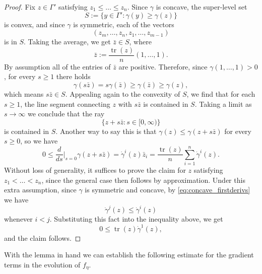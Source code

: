 \documentclass[12pt]{amsart}
\DeclareMathOperator{\tr}{tr}
\begin{document}
\begin{proof}
\label{lem:+_first_deriv}
Fix $z \in \Gamma'$ satisfying $z_1 \leq \dots \leq z_n$. Since $\gamma$ is concave, the super-level set 
\[S:= \{y \in \Gamma': \gamma(y) \geq \gamma(z)\}\]
is convex, and since $\gamma$ is symmetric, each of the vectors
\[(z_m , \dots, z_n, z_1, \dots, z_{m-1})\]
is in $S$. Taking the average, we get $\bar z \in S$, where 
\[\bar z := \frac{\tr(z)}{n} (1, \dots, 1).\]
By assumption all of the entries of $\bar z$ are positive. Therefore, since $\gamma(1,\dots,1) > 0$, for every $s \geq 1$ there holds 
\[\gamma(s\bar z) = s \gamma( \bar z) \geq \gamma(\bar z) \geq \gamma(z),\]
which means $s \bar z \in S$. Appealing again to the convexity of $S$, we find that for each $s \geq 1$, the line segment connecting $z$ with $s \bar z$ is contained in $S$. Taking a limit as $s \to \infty$ we conclude that the ray
\[\{z + s \bar z : s \in [0,\infty) \}\]
is contained in $S$. Another way to say this is that $\gamma(z) \leq \gamma(z + s \bar z)$ for every $s \geq 0$, so we have
\[0 \leq \frac{d}{ds}\bigg|_{s = 0} \gamma(z + s\bar z) = \dot \gamma^i(z) \bar z_i = \frac{\tr(z)}{n} \sum_{i =1}^n \dot \gamma^i (z).\]
Without loss of generality, it suffices to prove the claim for $z$ satisfying $z_1 < \dots < z_n$, since the general case then follows by approximation. Under this extra assumption, since $\gamma$ is symmetric and concave, by \eqref{eq:concave_firstderivs} we have 
\[\dot\gamma^j (z) \leq \dot \gamma^i(z)\] 
whenever $i < j$. Substituting this fact into the inequality above, we get
\[0 \leq \tr(z) \dot \gamma^1 (z) ,\]
and the claim follows. 
\end{proof}

With the lemma in hand we can establish the following estimate for the gradient terms in the evolution of $f_\eta$. 
\end{document}
